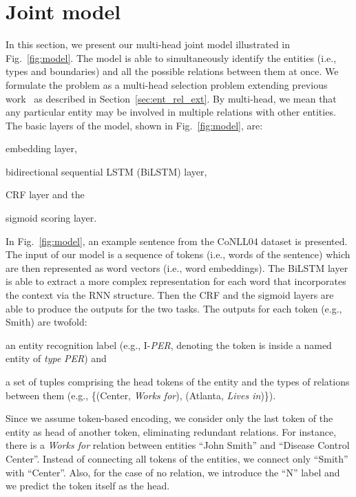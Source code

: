 \documentclass[review]{elsarticle}
\newcommand{\eg}{e.g., }
\newcommand{\ie}{i.e., }
\newcommand{\figref}[1]{Fig.~\ref{#1}}    \newcommand{\Figref}[1]{Figure~\ref{#1}}  \newcommand{\tabref}[1]{Table~\ref{#1}}
\newcommand{\secref}[1]{Section~\ref{#1}}
\begin{document}
\section{Joint model}
\label{sec:model}
\noindent
In this section, we present our multi-head joint model illustrated in \figref{fig:model}.  
The model is able to simultaneously identify the entities (\ie types and boundaries) and all the possible relations between them at once. 
We formulate the problem as a multi-head selection problem extending previous work~\citep{zhang:16,bekoulis:18} as described in \secref{sec:ent_rel_ext}.
By multi-head, we mean that any particular entity may be involved in multiple relations with other entities.
The basic layers of the model, shown in \figref{fig:model}, are:
\begin{enumerate*}[label=(\roman*)]
\item embedding layer,
\item bidirectional sequential LSTM (BiLSTM) layer,
\item CRF layer and the 
\item sigmoid scoring layer.
\end{enumerate*}
In \figref{fig:model}, an example sentence from the CoNLL04 dataset is presented.
The input of our model is a sequence of tokens (\ie words of the sentence) which are then represented as word vectors (\ie word embeddings). The BiLSTM layer is able to extract a more complex representation for each word that incorporates the context via the RNN structure. Then the CRF and the sigmoid layers are able to produce the outputs for the two tasks.
The outputs for each token (\eg Smith) are twofold: 
\begin{enumerate*}[label=(\roman*)]
\item an entity recognition label (\eg I-\emph{PER}, denoting the token is inside a named entity of \emph{type} \emph{PER}) and
\item a set of tuples comprising the head tokens of the entity and the types of relations between them (\eg \{(Center, \emph{Works for}), (Atlanta, \emph{Lives in})\}).
\end{enumerate*}
Since we assume token-based encoding, we consider only the last token of the entity as head of another token, eliminating redundant relations. For instance, there is  a \emph{Works for} relation between entities ``John Smith'' and ``Disease Control Center''. Instead of connecting all tokens of the entities, we connect only ``Smith'' with ``Center''. Also, for the case of no relation, we introduce the ``N'' label and we predict the token itself as the head. 
\end{document}
